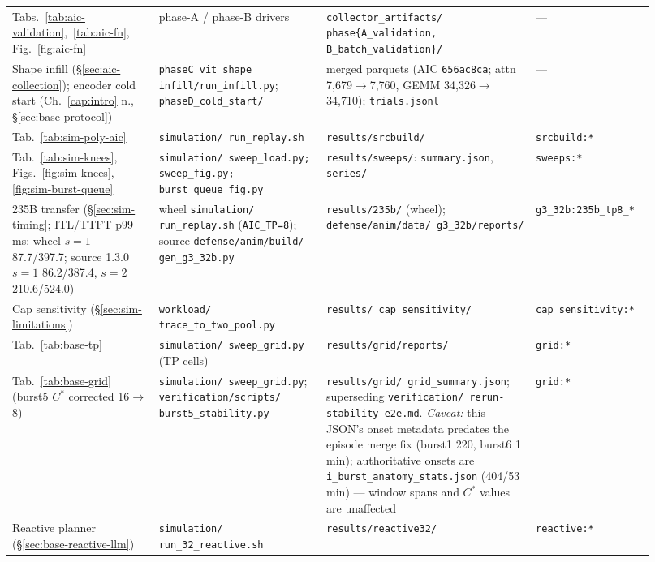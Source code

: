 {\begin{longtable}{@{}>{\raggedright\arraybackslash}p{0.215\linewidth}>{\raggedright\arraybackslash}p{0.245\linewidth}>{\raggedright\arraybackslash}p{0.30\linewidth}>{\raggedright\arraybackslash}p{0.155\linewidth}@{}}
Tabs.~\ref{tab:aic-validation},~\ref{tab:aic-fn}, Fig.~\ref{fig:aic-fn} &
  phase-A / phase-B drivers &
  \texttt{collector\_artifacts/ phase\{A\_validation,
  B\_batch\_validation\}/} & --- \\
Shape infill (\S\ref{sec:aic-collection}); encoder cold start
  (Ch.~\ref{cap:intro} n., \S\ref{sec:base-protocol}) &
  \texttt{phaseC\_vit\_shape\_ infill/run\_infill.py};
  \texttt{phaseD\_cold\_start/} &
  merged parquets (AIC \texttt{656ac8ca}; attn 7{,}679$\to$7{,}760, GEMM
  34{,}326$\to$34{,}710); \texttt{trials.jsonl} & --- \\
Tab.~\ref{tab:sim-poly-aic} & \texttt{simulation/ run\_replay.sh} &
  \texttt{results/srcbuild/} & \texttt{srcbuild:*} \\
Tab.~\ref{tab:sim-knees}, Figs.~\ref{fig:sim-knees},
  \ref{fig:sim-burst-queue} &
  \texttt{simulation/ sweep\_load.py; sweep\_fig.py; burst\_queue\_fig.py} &
  \texttt{results/sweeps/}: \texttt{summary.json}, \texttt{series/} &
  \texttt{sweeps:*} \\
235B transfer (\S\ref{sec:sim-timing}; ITL/TTFT p99 ms: wheel $s{=}1$
  87.7/397.7; source 1.3.0 $s{=}1$ 86.2/387.4, $s{=}2$ 210.6/524.0) &
  wheel \texttt{simulation/ run\_replay.sh} (\texttt{AIC\_TP=8}); source
  \texttt{defense/anim/build/ gen\_g3\_32b.py} &
  \texttt{results/235b/} (wheel); \texttt{defense/anim/data/ g3\_32b/reports/}
  & \texttt{g3\_32b:\allowbreak 235b\_tp8\_*} \\
Cap sensitivity (\S\ref{sec:sim-limitations}) &
  \texttt{workload/ trace\_to\_two\_pool.py} &
  \texttt{results/ cap\_sensitivity/} & \texttt{cap\_\allowbreak sensitivity:*} \\
Tab.~\ref{tab:base-tp} & \texttt{simulation/ sweep\_grid.py} (TP cells) &
  \texttt{results/grid/reports/} & \texttt{grid:*} \\
Tab.~\ref{tab:base-grid} (burst5 $C^{*}$ corrected 16$\to$8) &
  \texttt{simulation/ sweep\_grid.py}; \texttt{verification/scripts/
  burst5\_stability.py} &
  \texttt{results/grid/ grid\_summary.json}; superseding
  \texttt{verification/ rerun-stability-e2e.md}. \emph{Caveat:} this JSON's
  onset metadata predates the episode merge fix (burst1 220, burst6 1\,min);
  authoritative onsets are \texttt{i\_burst\_anatomy\_stats.json}
  (404/53\,min) --- window spans and $C^{*}$ values are unaffected &
  \texttt{grid:*} \\
Reactive planner (\S\ref{sec:base-reactive-llm}) &
  \texttt{simulation/ run\_32\_reactive.sh} & \texttt{results/reactive32/} &
  \texttt{reactive:*} \\

\end{longtable}}
